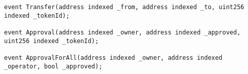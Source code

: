 \begin{lstlisting}[language=Solidity]
event Transfer(address indexed _from, address indexed _to, uint256 indexed _tokenId);

event Approval(address indexed _owner, address indexed _approved, uint256 indexed _tokenId);

event ApprovalForAll(address indexed _owner, address indexed _operator, bool _approved);
\end{lstlisting}
